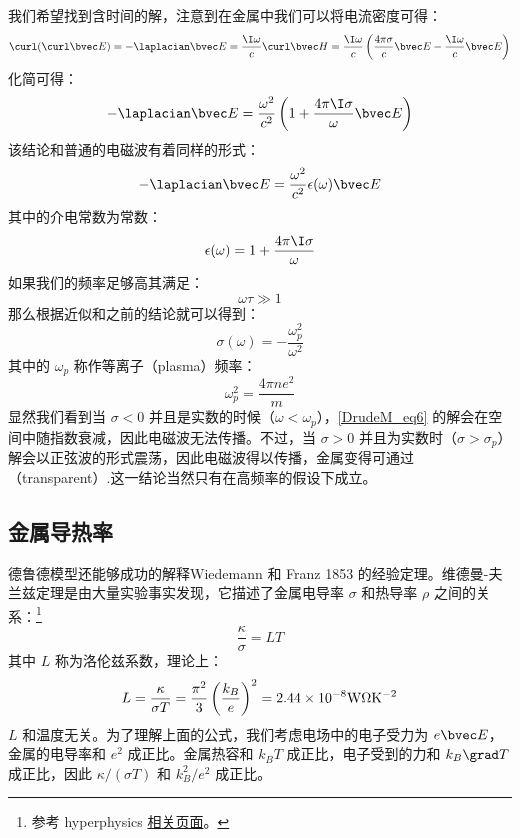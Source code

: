 我们希望找到含时间的解，注意到在金属中我们可以将电流密度可得：
\begin{equation}
\curl(\curl\bvec E)=-\laplacian \bvec E =\frac{\I\omega}{c}\curl\bvec H=\frac{\I\omega}{c}\left(\frac{4\pi\sigma}{c}\bvec E-\frac{\I\omega}{c}\bvec E\right)
\end{equation}
化简可得：
\begin{equation}
-\laplacian \bvec E =\frac{\omega^2}{c^2}\left(1+\frac{4\pi\I\sigma}{\omega}\bvec E\right)
\end{equation}
该结论和普通的电磁波有着同样的形式：
\begin{equation}\label{DrudeM_eq6}
-\laplacian \bvec E = \frac{\omega^2}{c^2}\epsilon(\omega)\bvec E
\end{equation}
其中的介电常数为常数：
\begin{equation}
\epsilon(\omega)=1+\frac{4\pi\I\sigma}{\omega}
\end{equation}
如果我们的频率足够高其满足：
\begin{equation}
\omega\tau\gg 1
\end{equation}
那么根据近似和之前的结论就可以得到：
\begin{equation}
\sigma(\omega)=-\frac{\omega_p^2}{\omega^2}
\end{equation}
其中的 $\omega_p$ 称作等离子（plasma）频率：
\begin{equation}
\omega_p^2=\frac{4\pi ne^2}{m}
\end{equation}
显然我们看到当 $\sigma<0$ 并且是实数的时候（$\omega<\omega_p$），\autoref{DrudeM_eq6} 的解会在空间中随指数衰减，因此电磁波无法传播。不过，当 $\sigma>0$ 并且为实数时（$\sigma>\sigma_p$）解会以正弦波的形式震荡，因此电磁波得以传播，金属变得可通过（transparent）.这一结论当然只有在高频率的假设下成立。

\subsection{金属导热率}
德鲁德模型还能够成功的解释Wiedemann 和 Franz 1853 的经验定理。维德曼-夫兰兹定理是由大量实验事实发现，它描述了金属电导率 $\sigma$ 和热导率 $\rho$ 之间的关系：\footnote{参考 hyperphysics \href{http://hyperphysics.phy-astr.gsu.edu/hbase/thermo/thercond.html}{相关页面}。}
\begin{equation}
\frac{\kappa}{\sigma}=LT
\end{equation}
其中 $L$ 称为洛伦兹系数，理论上：
\begin{equation}\label{DrudeM_eq47}
L=\frac{\kappa}{\sigma T}=\frac{\pi^2}{3}\left(\frac{k_B}{e}\right)^2 = 2.44\times10^{-8}\rm{W\Omega K^{-2}}
\end{equation}
$L$ 和温度无关。为了理解上面的公式，我们考虑电场中的电子受力为 $e\bvec E$，金属的电导率和 $e^2$ 成正比。金属热容和 $k_B T$ 成正比，电子受到的力和 $k_B\grad T$ 成正比，因此 $\kappa/(\sigma T)$ 和 $k_B^2/e^2$ 成正比。

